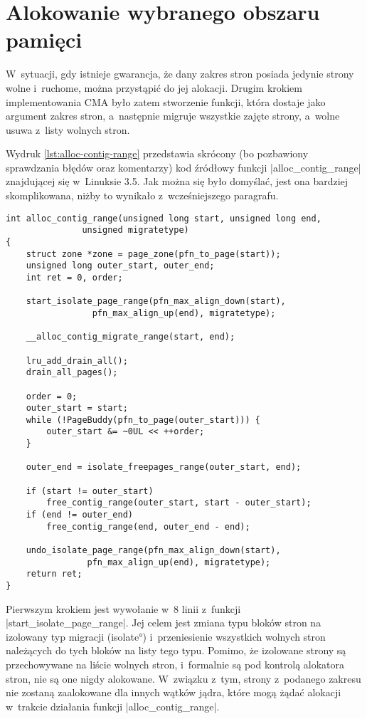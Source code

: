 \section{Alokowanie wybranego obszaru pamięci}\label{sec:alloc-contig-range}

W~sytuacji, gdy istnieje gwarancja, że dany zakres stron posiada
jedynie strony wolne i~ruchome, można przystąpić do jej alokacji.
Drugim krokiem implementowania CMA było zatem stworzenie funkcji,
która dostaje jako argument zakres stron, a~następnie migruje
wszystkie zajęte strony, a~wolne usuwa z~listy wolnych stron.

Wydruk \ref{lst:alloc-contig-range} przedstawia skrócony (bo
pozbawiony sprawdzania błędów oraz komentarzy) kod źródłowy funkcji
\code|alloc_contig_range| znajdującej się w~Linuksie 3.5.  Jak
można się było domyślać, jest ona bardziej skomplikowana, niżby to
wynikało z~wcześniejszego paragrafu.

\begin{lstlisting}[float=tbhp,caption=Skrócony wydruk funkcji
    \code|alloc_conting_range| z Linuksa 3.5.,label=lst:alloc-contig-range]
int alloc_contig_range(unsigned long start, unsigned long end,
		       unsigned migratetype)
{
	struct zone *zone = page_zone(pfn_to_page(start));
	unsigned long outer_start, outer_end;
	int ret = 0, order;

	start_isolate_page_range(pfn_max_align_down(start),
				 pfn_max_align_up(end), migratetype);

	__alloc_contig_migrate_range(start, end);

	lru_add_drain_all();
	drain_all_pages();

	order = 0;
	outer_start = start;
	while (!PageBuddy(pfn_to_page(outer_start))) {
		outer_start &= ~0UL << ++order;
	}

	outer_end = isolate_freepages_range(outer_start, end);

	if (start != outer_start)
		free_contig_range(outer_start, start - outer_start);
	if (end != outer_end)
		free_contig_range(end, outer_end - end);

	undo_isolate_page_range(pfn_max_align_down(start),
				pfn_max_align_up(end), migratetype);
	return ret;
}
\end{lstlisting}

Pierwszym krokiem jest wywołanie w~8 linii z~funkcji
\code|start_isolate_page_range|.  Jej celem jest zmiana typu
bloków stron na izolowany typ migracji (\ang{isolate}) i~przeniesienie
wszystkich wolnych stron należących do tych bloków na listy tego typu.
Pomimo, że izolowane strony są przechowywane na liście wolnych stron,
i~formalnie są pod kontrolą alokatora stron, nie są one nigdy
alokowane.  W~związku z~tym, strony z~podanego zakresu nie zostaną
zaalokowane dla innych wątków jądra, które mogą żądać alokacji
w~trakcie działania funkcji \code|alloc_contig_range|.

